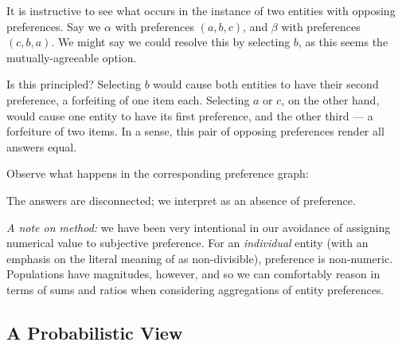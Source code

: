 It is instructive to see what occurs in the instance of two entities with opposing preferences.
Say we $\alpha$ with preferences $(a, b, c)$, and $\beta$ with preferences $(c, b, a)$.
We might say we could resolve this by selecting $b$, as this seems the mutually-agreeable option.

Is this principled?
Selecting $b$ would cause both entities to have their second preference, a forfeiting of one item each.
Selecting $a$ or $c$, on the other hand, would cause one entity to have its first preference, and the other third --- a forfeiture of two items.
In a sense, this pair of opposing preferences render all answers equal.

Observe what happens in the corresponding preference graph:

\begin{center}
\hspace{5mm}
\raisebox{2 cm}{$\rightarrow$}
\hspace{5mm}
\end{center}

The answers are disconnected; we interpret as an absence of preference.

\bigskip

\textit{A note on method:} we have been very intentional in our avoidance of assigning numerical value to subjective preference.
For an \textit{individual} entity (with an emphasis on the literal meaning of  as non-divisible), preference is non-numeric.
Populations have magnitudes, however, and so we can comfortably reason in terms of sums and ratios when considering aggregations of entity preferences.

\subsection{A Probabilistic View}

